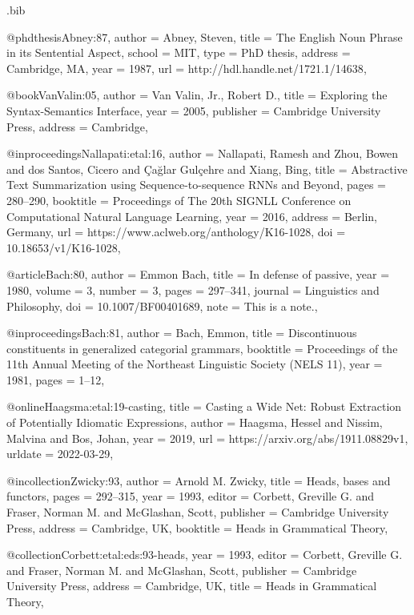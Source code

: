 \begin{filecontents}[overwrite]{\jobname.bib}

@phdthesis{Abney:87,
  author = {Abney, Steven},
  title = {The {English} Noun Phrase in its Sentential Aspect},
  school = {MIT},
  type = {PhD thesis},
  address = {Cambridge, MA},
  year = {1987},
  url = {http://hdl.handle.net/1721.1/14638},
}

@book{VanValin:05,
  author = {Van Valin, Jr., Robert D.},
  title = {Exploring the Syntax-Semantics Interface},
  year = {2005},
  publisher = {Cambridge University Press},
  address = {Cambridge},
}

@inproceedings{Nallapati:etal:16,
  author = {Nallapati, Ramesh and Zhou, Bowen and dos Santos, Cicero and  Çağlar Gulçehre and Xiang, Bing},
  title = {Abstractive Text Summarization using Sequence-to-sequence {RNN}s and Beyond},
  pages = {280--290},
  booktitle = {Proceedings of The 20th {SIGNLL} Conference on Computational Natural Language Learning},
  year = {2016},
  address = {Berlin, Germany},
  url = {https://www.aclweb.org/anthology/K16-1028},
  doi = {10.18653/v1/K16-1028},
}

@article{Bach:80,
  author = {Emmon Bach},
  title = {In defense of passive},
  year = {1980},
  volume = {3},
  number = {3},
  pages = {297--341},
  journal = {Linguistics and Philosophy},
  doi = {10.1007/BF00401689},
  note = {This is a note.},
}

@inproceedings{Bach:81,
  author = {Bach, Emmon},
  title = {Discontinuous constituents in generalized categorial grammars},
  booktitle = {Proceedings of the 11th Annual Meeting of the Northeast Linguistic Society (NELS 11)},
  year = {1981},
  pages = {1--12},
}

@online{Haagsma:etal:19-casting,
  title = {Casting a Wide Net: {Robust} Extraction of Potentially Idiomatic Expressions},
  author = {Haagsma, Hessel and Nissim, Malvina and Bos, Johan},
  year = {2019},
  url = {https://arxiv.org/abs/1911.08829v1},
  urldate = {2022-03-29},
}

@incollection{Zwicky:93,
  author = {Arnold M. Zwicky},
  title = {Heads, bases and functors},
  pages = {292--315},
  year = {1993},
  editor = {Corbett, Greville G. and Fraser, Norman M. and McGlashan, Scott},
  publisher = {Cambridge University Press},
  address = {Cambridge, UK},
  booktitle = {Heads in Grammatical Theory},
}

@collection{Corbett:etal:eds:93-heads,
  year = {1993},
  editor = {Corbett, Greville G. and Fraser, Norman M. and McGlashan, Scott},
  publisher = {Cambridge University Press},
  address = {Cambridge, UK},
  title = {Heads in Grammatical Theory},
} 


\end{filecontents}
